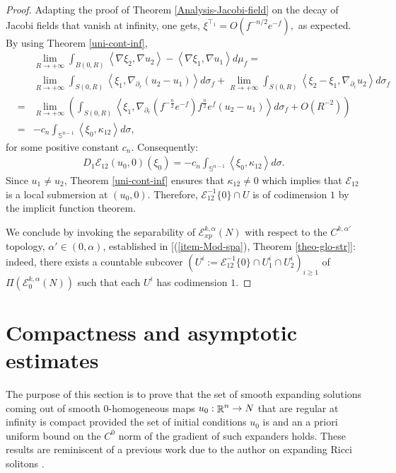 \documentclass[a4paper,11pt,reqno]{amsart}
\def\R{\mathop{\rm \mathbb{R}}\nolimits}
\newcommand{\Ent}{\mathcal{E}}
\begin{document}
\begin{proof}
Adapting the proof of Theorem \ref{Analysis-Jacobi-field} on the decay of Jacobi fields that vanish at infinity, one gets, $\xi^{\top_1}=\textit{O}(f^{-n/2}e^{-f}),$ as expected.\\
 
 By using Theorem \ref{uni-cont-inf},
\begin{eqnarray*}
&&\lim_{R\rightarrow+\infty}\int_{B(0,R)}\left<\nabla \xi_2,\nabla u_2\right>-\left<\nabla \xi_1,\nabla u_1\right>d\mu_f=\\
&&\lim_{R\rightarrow+\infty} \int_{S(0,R)}\left<\xi_1,\nabla_{\partial_r} (u_2-u_1)\right>d\sigma_f+\lim_{R\rightarrow+\infty} \int_{S(0,R)}\left<\xi_2-\xi_1,\nabla_{\partial_r} u_2\right>d\sigma_f\\
&=&\lim_{R\rightarrow+\infty} \left(\int_{S(0,R)}\left<\xi_1,\nabla_{\partial_r} (f^{-\frac{n}{2}}e^{-f})f^{\frac{n}{2}}e^f(u_2-u_1)\right>d\sigma_f+\textit{O}(R^{-2})\right)\\
&=&-c_n\int_{\mathbb{S}^{n-1}}\left<\xi_0, \kappa_{12}\right>d\sigma,
\end{eqnarray*}
for some positive constant $c_n$. Consequently:
\begin{eqnarray*}
D_1\mathcal{E}_{12}(u_0,0)(\xi_0)=-c_n\int_{\mathbb{S}^{n-1}}\left<\xi_0, \kappa_{12}\right>d\sigma.
\end{eqnarray*}
Since $u_1\neq u_2$, Theorem \ref{uni-cont-inf} ensures that $\kappa_{12}\neq 0$ which implies that $\mathcal{E}_{12}$ is a local submersion at $(u_0,0)$. Therefore, $\mathcal{E}_{12}^{-1}\{0\}\cap U $ is of codimension $1$ by the implicit function theorem. 

We conclude by invoking the separability of $\Ent_{xp}^{k,\alpha}(N)$ with respect to the $C^{k,\alpha'}$ topology, $\alpha'\in(0,\alpha)$, established in [(\ref{item-Mod-spa}), Theorem \ref{theo-glo-str}]: indeed, there exists a countable subcover $(U^i:=\mathcal{E}_{12}^{-1}\{0\}\cap U^i_1\cap U^i_2)_{i\geq 1}$ of $\Pi(\mathcal{E}^{k,\alpha}_0(N))$ such that each $U^i$ has codimension $1$.  
\end{proof}

\section{Compactness and asymptotic estimates}\label{sec-com-asy-est-neg-cur}

The purpose of this section is to prove that the set of smooth expanding solutions coming out of smooth $0$-homogeneous maps $u_0:\R^n\rightarrow N$ that are regular at infinity is compact provided the set of initial conditions $u_0$ is and an a priori uniform bound on the $C^0$ norm of the gradient of such expanders holds. These results are reminiscent of a previous work due to the author on expanding Ricci solitons \cite{Der-Asy-Com-Egs}.
\end{document}
